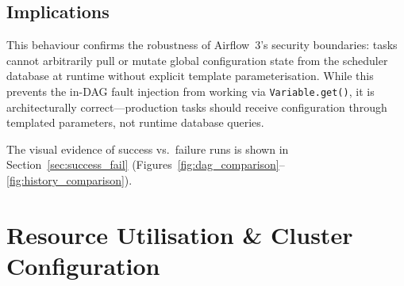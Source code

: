 \documentclass{article}
\begin{document}
\subsection{Implications}

This behaviour confirms the robustness of Airflow~3's security boundaries: tasks cannot arbitrarily pull or mutate global configuration state from the scheduler database at runtime without explicit template parameterisation. While this prevents the in-DAG fault injection from working via \texttt{Variable.get()}, it is architecturally correct—production tasks should receive configuration through templated parameters, not runtime database queries.

The visual evidence of success vs.\ failure runs is shown in Section~\ref{sec:success_fail} (Figures~\ref{fig:dag_comparison}--\ref{fig:history_comparison}).



\section{Resource Utilisation \& Cluster Configuration}
\end{document}
